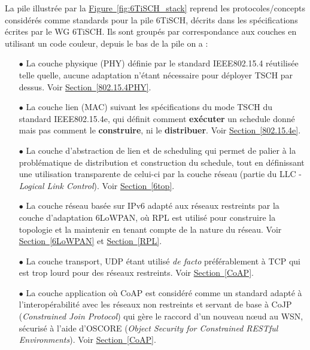 \documentclass[]{report}
\newcommand{\wordlink}[2]{\hyperref[#2]{#1~\ref{#2}}}
\begin{document}
\vspace{0.4cm}

La pile illustrée par la \wordlink{Figure}{fig:6TiSCH_stack} reprend les protocoles/concepts considérés comme standards pour la pile 6TiSCH, décrits dans les spécifications écrites par le WG 6TiSCH. Ils sont groupés par correspondance aux couches en utilisant un code couleur, depuis le bas de la pile on a :

\vspace{0.3cm}
\begin{itemize}
\item[$\bullet$] La couche physique (PHY) définie par le standard IEEE802.15.4 réutilisée telle quelle, aucune adaptation n'étant nécessaire pour déployer TSCH par dessus. Voir \wordlink{Section}{802.15.4PHY}.
\vspace{0.2cm}
\item[$\bullet$] La couche lien (MAC) suivant les spécifications du mode TSCH du standard IEEE802.15.4e, qui définit comment \textbf{exécuter} un schedule donné mais pas comment le \textbf{construire}, ni le \textbf{distribuer}. Voir \wordlink{Section}{802.15.4e}.
\vspace{0.2cm}
\item[$\bullet$] La couche d'abstraction de lien et de scheduling qui permet de palier à la problématique de distribution et construction du schedule, tout en définissant une utilisation transparente de celui-ci par la couche réseau (partie du LLC - \textit{Logical Link Control}). Voir \wordlink{Section}{6top}.
\vspace{0.2cm}
\item[$\bullet$] La couche réseau basée sur IPv6 adapté aux réseaux restreints par la couche d'adaptation 6LoWPAN, où RPL est utilisé pour construire la topologie et la maintenir en tenant compte de la nature du réseau. Voir \wordlink{Section}{6LoWPAN} et \wordlink{Section}{RPL}.
\vspace{0.2cm}
\item[$\bullet$] La couche transport, UDP étant utilisé \textit{de facto} préférablement à TCP qui est trop lourd pour des réseaux restreints. Voir \wordlink{Section}{CoAP}.
\vspace{0.2cm}
\item[$\bullet$] La couche application où CoAP est considéré comme un standard adapté à l’interopérabilité avec les réseaux non restreints et servant de base à CoJP (\textit{Constrained Join Protocol}) qui gère le raccord d'un nouveau nœud au WSN, sécurisé à l'aide d'OSCORE (\textit{Object Security for Constrained RESTful Environments}). Voir \wordlink{Section}{CoAP}.
\vspace{0.1cm}
\end{itemize}
\end{document}
